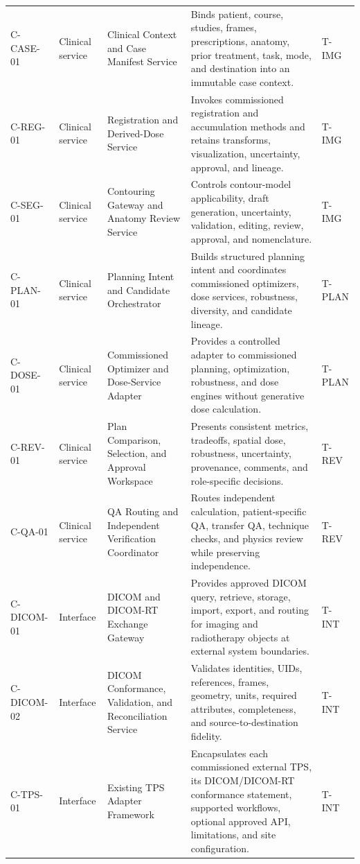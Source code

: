 \documentclass[11pt,letterpaper]{article}
\begin{document}
\begin{small}
\begin{longtable}{@{}L{0.12\textwidth}L{0.13\textwidth}L{0.23\textwidth}L{0.37\textwidth}L{0.08\textwidth}@{}}
\addlinespace[2pt]
C-CASE-01 & Clinical service & Clinical Context and Case Manifest Service & Binds patient, course, studies, frames, prescriptions, anatomy, prior treatment, task, mode, and destination into an immutable case context. & T-IMG \\
\addlinespace[2pt]
C-REG-01 & Clinical service & Registration and Derived-Dose Service & Invokes commissioned registration and accumulation methods and retains transforms, visualization, uncertainty, approval, and lineage. & T-IMG \\
\addlinespace[2pt]
C-SEG-01 & Clinical service & Contouring Gateway and Anatomy Review Service & Controls contour-model applicability, draft generation, uncertainty, validation, editing, review, approval, and nomenclature. & T-IMG \\
\addlinespace[2pt]
C-PLAN-01 & Clinical service & Planning Intent and Candidate Orchestrator & Builds structured planning intent and coordinates commissioned optimizers, dose services, robustness, diversity, and candidate lineage. & T-PLAN \\
\addlinespace[2pt]
C-DOSE-01 & Clinical service & Commissioned Optimizer and Dose-Service Adapter & Provides a controlled adapter to commissioned planning, optimization, robustness, and dose engines without generative dose calculation. & T-PLAN \\
\addlinespace[2pt]
C-REV-01 & Clinical service & Plan Comparison, Selection, and Approval Workspace & Presents consistent metrics, tradeoffs, spatial dose, robustness, uncertainty, provenance, comments, and role-specific decisions. & T-REV \\
\addlinespace[2pt]
C-QA-01 & Clinical service & QA Routing and Independent Verification Coordinator & Routes independent calculation, patient-specific QA, transfer QA, technique checks, and physics review while preserving independence. & T-REV \\
\addlinespace[2pt]
C-DICOM-01 & Interface & DICOM and DICOM-RT Exchange Gateway & Provides approved DICOM query, retrieve, storage, import, export, and routing for imaging and radiotherapy objects at external system boundaries. & T-INT \\
\addlinespace[2pt]
C-DICOM-02 & Interface & DICOM Conformance, Validation, and Reconciliation Service & Validates identities, UIDs, references, frames, geometry, units, required attributes, completeness, and source-to-destination fidelity. & T-INT \\
\addlinespace[2pt]
C-TPS-01 & Interface & Existing TPS Adapter Framework & Encapsulates each commissioned external TPS, its DICOM\slash\allowbreak{}DICOM-RT conformance statement, supported workflows, optional approved API, limitations, and site configuration. & T-INT \\

\end{longtable}
\end{small}
\end{document}
